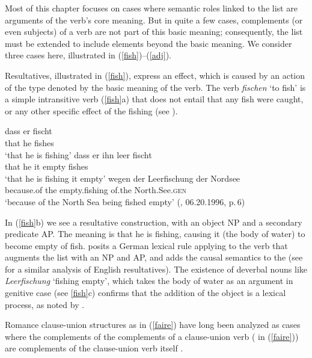 \documentclass[output=paper
	        ,collection
	        ,collectionchapter
 	        ,biblatex
                ,babelshorthands
                ,newtxmath
                ,draftmode
                ,colorlinks, citecolor=brown
]{langscibook}
\begin{document}
Most of this chapter focuses on cases where semantic roles linked to the \argst list are arguments of the verb's core meaning. But in quite a few cases, complements (or even subjects) of a verb are not part of this basic meaning; consequently, the \argst list must be extended to include elements beyond the basic meaning. We consider three cases here, illustrated in (\ref{fish})--(\ref{adj}).  

Resultatives,  illustrated in (\ref{fish}), express an effect, which is caused by an action of the type denoted by the basic meaning of the verb. The verb \textit{fischen} `to fish' is a simple intransitive verb (\ref{fish}a) that does not entail that any fish were caught, or any other specific effect of the fishing (see \citealt[219--220]{Mueller2002b}).  

\begin{exe}
\ex\label{fish}
\begin{xlist}
\ex
\gll dass er  fischt\\
     that he  fishes\\
\glt `that he is fishing'
\ex 
\gll dass er ihn leer fischt\\
     that he it empty fishes\\
\glt `that he is fishing it empty'
\ex 
\gll wegen der Leerfischung der Nordsee \\
     because.of the empty.fishing of.the North.See.\textsc{gen} \\
\glt `because of the North Sea being fished empty' (, 06.20.1996, p.\,6)
\end{xlist}
\end{exe}

\noindent
 In (\ref{fish}b) we see a resultative construction, with an object NP and a secondary predicate AP.  The meaning is that he is fishing, causing it (the body of water) to become empty of fish.  \citet[241]{Mueller2002b} posits a German lexical rule applying to the verb that augments the \argst list with an NP and AP, and adds the causal semantics to the \content (see \citealt{Wechsler2005result} for a similar analysis of English resultatives).     The existence of deverbal nouns like \textit{Leerfischung} `fishing empty', which takes the body of water as an argument in genitive case (see \ref{fish}c) confirms that the addition of the object is a lexical process, as noted by \citet{Mueller2002b}.  

Romance clause-union structures as in (\ref{faire}) have long been analyzed as cases where the complements of the complements of a clause-union verb ( in (\ref{faire})) are complements of the clause-union verb itself \citep{Aissen1979}.
\end{document}
